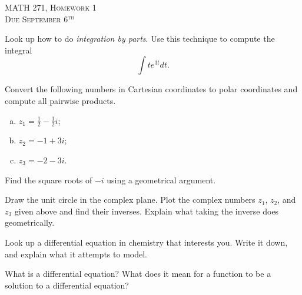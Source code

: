 \documentclass[12pt]{article} %
\begin{document}
\begin{center}
   \textsc{\large MATH 271, Homework 1}\\
   \textsc{Due September 6$^\textrm{th}$}
\end{center}
\vspace{.5cm}

\begin{problem}
    Look up how to do \emph{integration by parts}. Use this technique to compute the integral
    \[
        \int t e^{3t}dt.
    \]
\end{problem}

\begin{problem}
Convert the following numbers in Cartesian coordinates to polar coordinates and compute all pairwise products.
\begin{enumerate}[(a)]
    \item $z_1=\frac{1}{2}-\frac{1}{2}i$;
    \item $z_2=-1+3i$;
    \item $z_3=-2-3i$.
\end{enumerate}
\end{problem}

\begin{problem}
Find the square roots of $-i$ using a geometrical argument.
\end{problem}

\begin{problem}
Draw the unit circle in the complex plane. Plot the complex numbers $z_1$, $z_2$, and $z_3$ given above and find their inverses. Explain what taking the inverse does geometrically.
\end{problem}

\begin{problem}
    Look up a differential equation in chemistry that interests you.  Write it down, and explain what it attempts to model.
\end{problem}

\begin{problem}
    What is a differential equation? What does it mean for a function to be a solution to a differential equation?
\end{problem}
\end{document}

